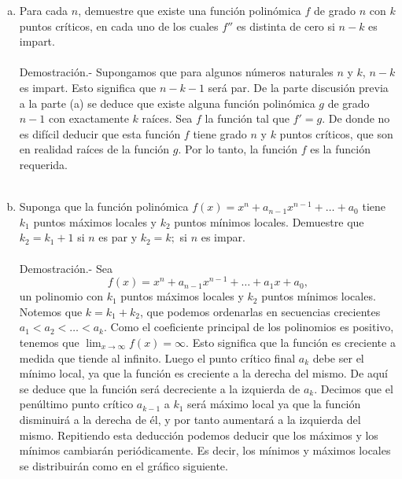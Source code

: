 \begin{enumerate}[\bfseries 1.]
\begin{enumerate}[(a)]
	    \item Para cada $n$, demuestre que existe una función polinómica $f$ de grado $n$ con $k$ puntos críticos, en cada uno de los cuales $f''$ es distinta de cero si $n-k$ es impart.\\\\
		Demostración.-\; Supongamos que para algunos números naturales $n$ y $k$, $n-k$ es impart. Esto significa que $n-k-1$ será par. De la parte discusión previa a la parte (a) se deduce que existe alguna función polinómica $g$ de grado $n-1$ con exactamente $k$ raíces. Sea $f$ la función tal que $f'=g$. De donde no es difícil deducir que esta función $f$ tiene grado $n$ y $k$ puntos críticos, que son en realidad raíces de la función $g$. Por lo tanto, la función $f$ es la función requerida.\\\\

	    \item Suponga que la función polinómica $f(x)=x^n+a_{n-1}x^{n-1}+\ldots + a_0$ tiene $k_1$ puntos máximos locales y $k_2$ puntos mínimos locales. Demuestre que $k_2=k_1+1$ si $n$ es par y $k_2=k;$ si $n$ es impar.\\\\
		Demostración.-\; Sea 
		$$f(x)=x^n+a_{n-1}x^{n-1}+\ldots + a_1x+a_0,$$
		un polinomio con $k_1$ puntos máximos locales y $k_2$ puntos mínimos locales. Notemos que $k=k_1+k_2$, que podemos ordenarlas en secuencias crecientes $a_1<a_2<\ldots < a_k$. Como el coeficiente principal de los polinomios es positivo, tenemos que $\lim_{x\to \infty} f(x)=\infty.$ Esto significa que la función es creciente a medida que tiende al infinito. Luego el punto crítico final $a_k$ debe ser el mínimo local, ya que la función es creciente a la derecha del mismo. De aquí se deduce que la función será decreciente a la izquierda de $a_k$. Decimos que el penúltimo punto crítico $a_{k-1}$ a  $k_1$ será máximo local ya que la función disminuirá a la derecha de él, y por tanto aumentará a la izquierda del mismo. Repitiendo esta deducción podemos deducir que los máximos y los mínimos cambiarán periódicamente. Es decir, los mínimos y máximos locales se distribuirán como en el gráfico siguiente.


\end{enumerate}
\end{enumerate}
